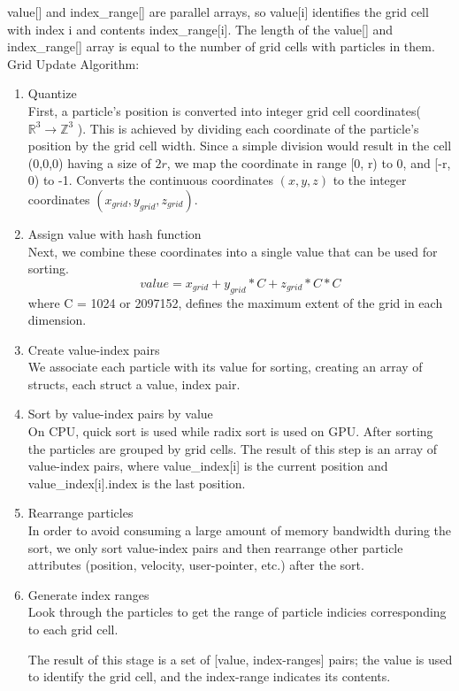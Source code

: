 \documentclass[]{article}
\begin{document}
			value[] and index\_range[] are parallel arrays, so value[i] identifies the grid cell with index i and contents 
			index\_range[i]. The length of the value[] and index\_range[] array is equal to the number of grid cells with 
			particles in them.\\
			
			Grid Update Algorithm:
			\begin{enumerate}
				\item Quantize\\
				First, a particle's position is converted into integer grid cell coordinates( \( \mathbb{R}^{3} \to \mathbb{Z}^{3}\) ).
				This is achieved by dividing each coordinate of the particle's position by the grid cell width.
				Since a simple division would result in the cell (0,0,0) having a size of \(2r\), we map the coordinate 
				in range [0, r) to 0, and [-r, 0) to -1. Converts the continuous coordinates \((x, y, z)\) to the integer 
				coordinates \((x_{grid}, y_{grid}, z_{grid})\).
				
				\item Assign value with hash function\\
				Next, we combine these coordinates into a single value that can be used for sorting.
				\begin{equation}
					\label{eq_hash}
				value = x_{grid} + y_{grid} * C + z_{grid} * C * C
				\end{equation}
				where C = 1024 or 2097152, defines the maximum extent of the grid in each dimension.
				
				\item Create value-index pairs\\
				We associate each particle with its value for sorting, creating an array of structs, each struct a 
				{value, index} pair.
				
				\item Sort by value-index pairs by value\\
				On CPU, quick sort is used while radix sort is used on GPU. After sorting the particles are grouped by 
				grid cells. The result of this step is an array of value-index pairs, where value\_index[i] is the current 
				position and value\_index[i].index is the last position.
			
				\item Rearrange particles\\
				In order to avoid consuming a large amount of memory bandwidth during the sort, we only sort value-index 
				pairs and then rearrange other particle attributes (position, velocity, user-pointer, etc.) after the sort.
			
				\item Generate index ranges\\
				Look through the particles to get the range of particle indicies corresponding to each grid cell.
				
				The result of this stage is a set of [value, index-ranges] pairs; the value is used to identify
				the grid cell, and the index-range indicates its contents.
			\end{enumerate}
			
\end{document}
